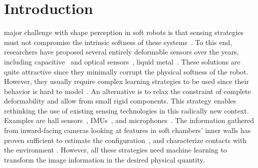 \section{Introduction}\label{sec:srslam:introduction}
%
 major challenge with shape perception in soft robots is that sensing strategies must not compromise the intrinsic softness of these systems~\citep{polygerinos2017soft,wang2018toward}. %
%
To this end, researchers have proposed several entirely deformable sensors over the years, including capacitive~\citep{scimeca2019model} and optical sensors~\citep{li2021scaling}, liquid metal~\citep{wall2017method}. These solutions are quite attractive since they minimally corrupt the physical softness of the robot. However, they usually require complex learning strategies to be used since their behavior is hard to model~\citep{thuruthel2019soft,truby2020distributed}.
%
% 
An alternative is to relax the constraint of complete deformability and allow from small rigid components. This strategy enables rethinking the use of existing sensing technologies in this radically new context. Examples are hall sensors~\citep{guo2019continuum}, IMUs~\citep{hughes2020sensing}, and microphones~\citep{zoller2018acoustic}. %
%
The information gathered from inward-facing cameras looking at features in soft chambers' inner walls has proven sufficient to estimate the configuration~\citep{she2020exoskeleton,werner2020vision}, and characterize contacts with the environment \citep{ward2018tactip,lin2020curvature}. However, all these strategies need machine learning to transform the image information in the desired physical quantity.
%
